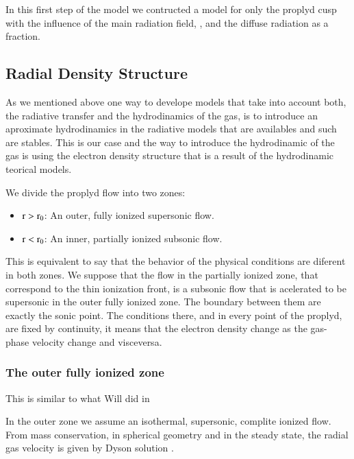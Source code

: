 \documentclass[useAMS,usenatbib]{mn2e}
\begin{document}
In this first step of the model we contructed a model for only the proplyd cusp with the influence of the main radiation field, \tc, and the diffuse radiation as a \tc fraction.

\subsection{Radial Density Structure}
\label{sec:density}

As we mentioned above one way to develope models that take into account both, the radiative transfer and the hydrodinamics of the gas, is to introduce an aproximate hydrodinamics in the radiative models that are availables and such are stables. This is our case and the way to introduce the hydrodinamic of the gas is using the electron density structure that is a result of the hydrodinamic teorical models.

We divide the proplyd flow into two zones:

\begin{itemize}
  \item{$\rm r > r_0$: An outer, fully ionized supersonic flow.}
    \item{$\rm r < r_0$: An inner, partially ionized subsonic flow.}
\end{itemize}

This is equivalent to say that the behavior of the physical conditions are diferent in both zones. We suppose that the flow in the partially ionized zone, that correspond to the thin ionization front, is a subsonic flow that is acelerated to be supersonic in the outer fully ionized zone. The boundary between them are exactly the sonic point. The conditions there, and in every point of the proplyd, are fixed by continuity, it means that the electron density change as the gas-phase velocity change and visceversa. 


\subsubsection{The outer fully ionized zone}
\label{sec:outer}

This is similar to what Will did in \citep{2002ApJ...566..315H}

In the outer zone we assume an isothermal, supersonic, complite ionized flow. From mass conservation, in spherical geometry and in the steady state, the radial gas velocity is given by Dyson solution \citep{1968Ap26SS...2..461D}.
\end{document}

